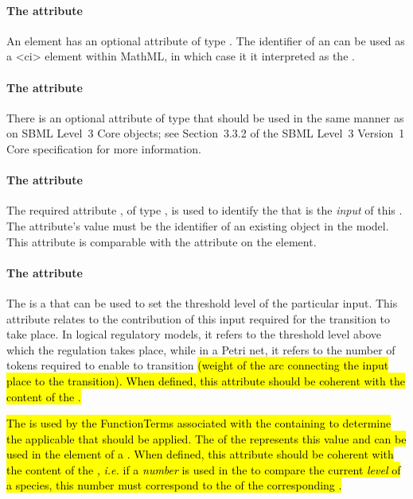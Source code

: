 \paragraph{The  attribute}
An \Input element has an optional  attribute of type . The identifier of an \Input can be used as a 
<ci> element within MathML, in which case it it interpreted as the .

\paragraph{The  attribute}
There is an optional  attribute of type  that should be used
in the same manner as on SBML Level~3 Core
objects; see Section~3.3.2 of the SBML Level~3 Version~1 Core
specification for more information.


\paragraph{The  attribute}
The required attribute , of type , is used to identify the \QualitativeSpecies that is the \emph{input} of this \Transition.  The attribute's value must be the identifier of an existing \QualitativeSpecies object in the model.  This attribute is comparable with the  attribute on the  element.

\paragraph{The   attribute}
The  is a  that can be used to set the threshold level of the particular input. This attribute relates to the contribution of this input required for the transition to take place. In logical regulatory models, it refers to the threshold level above which the regulation takes place, while in a Petri net, it refers to the number of tokens required to enable to transition \hl{(weight of the arc connecting the input place to the transition). When defined, this attribute should be coherent with the content of the \FunctionTerm.}

\hl{The  is used by the FunctionTerms associated with the containing \Transition to determine the applicable  that should be applied. The  of the \Input represents this value and can be used in the  element of a \FunctionTerm. When defined, this attribute should be coherent with the content of the \FunctionTerm, {\em i.e.} if a \emph{number} is used in the \FunctionTerm to compare the current \emph{level} of a species, this number must correspond to the  of the corresponding \Input.}

